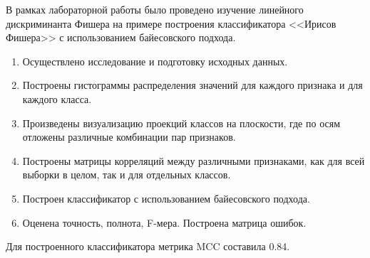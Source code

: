 
В рамках лабораторной работы было проведено изучение линейного дискриминанта Фишера на примере построения классификатора <<Ирисов Фишера>> с использованием байесовского подхода.

\begin{enumerate}[label*=\arabic*.]
	\item Осуществлено исследование и подготовку исходных данных.
	\item Построены гистограммы распределения значений для каждого признака и для каждого класса.
	\item Произведены визуализацию проекций классов на плоскости, где по осям отложены различные комбинации пар признаков.
	\item Построены матрицы корреляций между различными признаками, как для всей выборки в целом, так и для отдельных классов.
	\item Построен классификатор с использованием байесовского подхода.
	\item Оценена точность, полнота, F-мера. Построена матрица ошибок.
\end{enumerate}

Для построенного классификатора метрика MCC составила 0.84.
